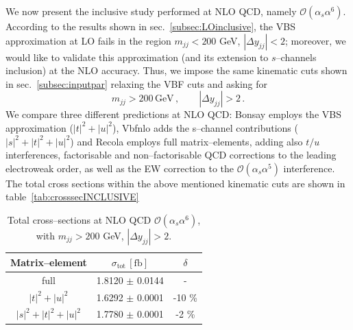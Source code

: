 We now present the inclusive study performed at NLO QCD, namely $\mathcal{O}(\alpha_s\alpha^6)$.\\
According to the results shown in sec.~\ref{subsec:LOinclusive}, the VBS approximation at LO fails in the region $m_{jj} < 200$ GeV, $|\Delta y_{jj}| < 2$; moreover, we would like to validate this approximation (and its extension to $s$--channels inclusion) at the NLO accuracy. Thus, we impose the same kinematic cuts shown in sec.~\ref{subsec:inputpar} relaxing the VBF cuts and asking for
\begin{equation}
	m_{jj} > 200 \,\textrm{GeV}\,,\qquad |\Delta y_{jj}| > 2\,.
\end{equation}
We compare three different predictions at NLO QCD: {\sc Bonsay} employs the VBS approximation ($|t|^2+|u|^2$), {\sc Vbfnlo} adds the s--channel contributions ($|s|^2+|t|^2+|u|^2$) and {\sc Recola} employs full matrix--elements, adding also $t/u$ interferences, factorisable and non--factorisable QCD corrections to the leading electroweak order, as well as the EW correction to the $\mathcal{O}(\alpha_s\alpha^5)$ interference. The total cross sections within the above mentioned kinematic cuts are shown in table~\ref{tab:crosssecINCLUSIVE}
\begin{table}[h!]
\centering
\begin{tabular}{c|c|c}
\bf Matrix--element & $\sigma_{\textrm{tot}}\,[\textrm{fb}]$ & $\delta$ \\
\hline
\hline
full &  1.8120 $\pm$ 0.0144 & - \\
\hline
$|t|^2 + |u|^2$ & 1.6292 $\pm$ 0.0001  &  -10 \% \\
\hline
$|s|^2 + |t|^2 + |u|^2$ & 1.7780 $\pm$ 0.0001  & -2 \%
\end{tabular}
\caption{Total cross--sections at NLO QCD $\mathcal{O}(\alpha_s\alpha^6)$, with $m_{jj}>200$ GeV, $|\Delta y_{jj}|>2$.}
\end{table}\label{tab:crosssecINCLUSIVE}


